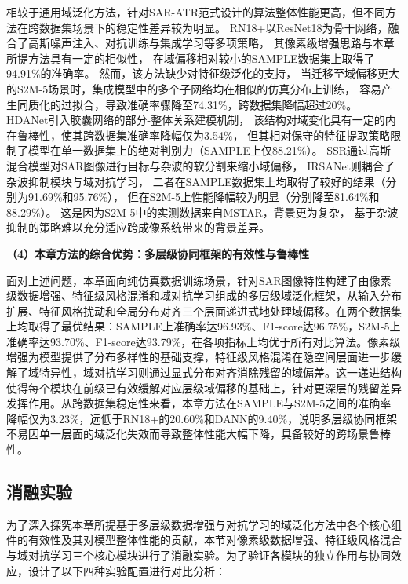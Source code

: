 相较于通用域泛化方法，针对SAR-ATR范式设计的算法整体性能更高，但不同方法在跨数据集场景下的稳定性差异较为明显。
RN18+以ResNet18为骨干网络，融合了高斯噪声注入、对抗训练与集成学习等多项策略，
其像素级增强思路与本章所提方法具有一定的相似性，
在域偏移相对较小的SAMPLE数据集上取得了94.91\%的准确率。
然而，该方法缺少对特征级泛化的支持，
当迁移至域偏移更大的S2M-5场景时，集成模型中的多个子网络均在相似的仿真分布上训练，
容易产生同质化的过拟合，导致准确率骤降至74.31\%，跨数据集降幅超过20\%。
HDANet引入胶囊网络的部分-整体关系建模机制，
该结构对域变化具有一定的内在鲁棒性，使其跨数据集准确率降幅仅为3.54\%，
但其相对保守的特征提取策略限制了模型在单一数据集上的绝对判别力（SAMPLE上仅88.21\%）。
SSR通过高斯混合模型对SAR图像进行目标与杂波的软分割来缩小域偏移，
IRSANet则耦合了杂波抑制模块与域对抗学习，
二者在SAMPLE数据集上均取得了较好的结果（分别为91.69\%和95.76\%），
但在S2M-5上性能降幅较为明显（分别降至81.64\%和88.29\%）。
这是因为S2M-5中的实测数据来自MSTAR，背景更为复杂，
基于杂波抑制的策略难以充分适应跨成像系统带来的背景差异。



\textbf{（4）本章方法的综合优势：多层级协同框架的有效性与鲁棒性}

面对上述问题，本章面向纯仿真数据训练场景，针对SAR图像特性构建了由像素级数据增强、特征级风格混淆和域对抗学习组成的多层级域泛化框架，从输入分布扩展、特征风格扰动和全局分布对齐三个层面递进式地处理域偏移。在两个数据集上均取得了最优结果：SAMPLE上准确率达96.93\%、F1-score达96.75\%，S2M-5上准确率达93.70\%、F1-score达93.79\%，在各项指标上均优于所有对比算法。像素级增强为模型提供了分布多样性的基础支撑，特征级风格混淆在隐空间层面进一步缓解了域特异性，域对抗学习则通过显式分布对齐消除残留的域偏差。这一递进结构使得每个模块在前级已有效缓解对应层级域偏移的基础上，针对更深层的残留差异发挥作用。从跨数据集稳定性来看，本章方法在SAMPLE与S2M-5之间的准确率降幅仅为3.23\%，远低于RN18+的20.60\%和DANN的9.40\%，说明多层级协同框架不易因单一层面的域泛化失效而导致整体性能大幅下降，具备较好的跨场景鲁棒性。



\subsection{消融实验}

为了深入探究本章所提基于多层级数据增强与对抗学习的域泛化方法中各个核心组件的有效性及其对模型整体性能的贡献，本节对像素级数据增强、特征级风格混合与域对抗学习三个核心模块进行了消融实验。为了验证各模块的独立作用与协同效应，设计了以下四种实验配置进行对比分析：


